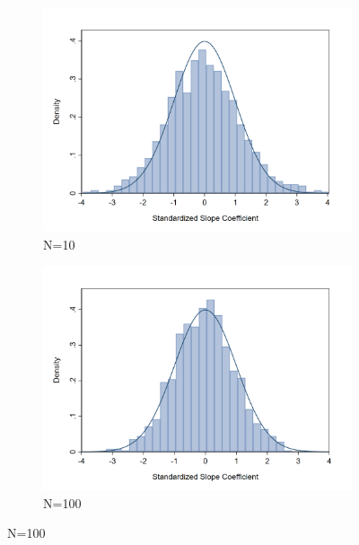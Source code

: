 \documentclass[a4paper,12pt]{article}
\begin{document}
\begin{figure}[H]
        \begin{subfigure}[c]{0.49\textwidth}
            \centering
            \includegraphics[width=1\textwidth]{figures/sampling_error_beta1_10}
            \caption{N=10}
            \label{fig:sampling error beta1 N10}								
        \end{subfigure}
        \begin{subfigure}[c]{0.49\textwidth}
            \centering
            \includegraphics[width=1\textwidth]{figures/sampling_error_beta1_100}
            \caption{N=100}
            \label{fig:sampling error beta1 N100}								
        \end{subfigure}
    \end{figure}
\end{document}
